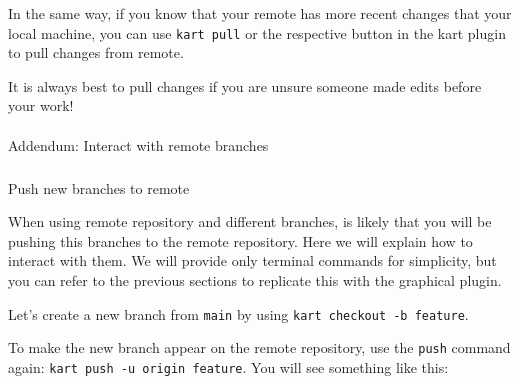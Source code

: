 \documentclass[
  letterpaper,
  DIV=11,
  numbers=noendperiod]{scrartcl}
\makeatletter
\let\oldparagraph\paragraph
\renewcommand{\paragraph}{
    \@ifstar
      \xxxParagraphStar
      \xxxParagraphNoStar
  }
\newcommand{\xxxParagraphStar}[1]{\oldparagraph*{#1}\mbox{}}
\newcommand{\xxxParagraphNoStar}[1]{\oldparagraph{#1}\mbox{}}
\let\oldsubparagraph\subparagraph
\renewcommand{\subparagraph}{
    \@ifstar
      \xxxSubParagraphStar
      \xxxSubParagraphNoStar
  }
\newcommand{\xxxSubParagraphStar}[1]{\oldsubparagraph*{#1}\mbox{}}
\newcommand{\xxxSubParagraphNoStar}[1]{\oldsubparagraph{#1}\mbox{}}
\makeatother
\begin{document}
\begin{tcolorbox}[enhanced jigsaw, arc=.35mm, colbacktitle=quarto-callout-note-color!10!white, colframe=quarto-callout-note-color-frame, coltitle=black, breakable, left=2mm, bottomrule=.15mm, rightrule=.15mm, opacitybacktitle=0.6, titlerule=0mm, opacityback=0, toptitle=1mm, title=\textcolor{quarto-callout-note-color}{\faInfo}\hspace{0.5em}{Note}, toprule=.15mm, bottomtitle=1mm, colback=white, leftrule=.75mm]

In the same way, if you know that your remote has more recent changes
that your local machine, you can use \texttt{kart\ pull} or the
respective button in the kart plugin to pull changes from remote.

It is always best to pull changes if you are unsure someone made edits
before your work!

\end{tcolorbox}

\paragraph{Addendum: Interact with remote
branches}\label{addendum-interact-with-remote-branches}

\subparagraph{Push new branches to
remote}\label{push-new-branches-to-remote}

When using remote repository and different branches, is likely that you
will be pushing this branches to the remote repository. Here we will
explain how to interact with them. We will provide only terminal
commands for simplicity, but you can refer to the previous sections to
replicate this with the graphical plugin.

Let's create a new branch from \texttt{main} by using
\texttt{kart\ checkout\ -b\ feature}.

To make the new branch appear on the remote repository, use the
\texttt{push} command again: \texttt{kart\ push\ -u\ origin\ feature}.
You will see something like this:
\end{document}
